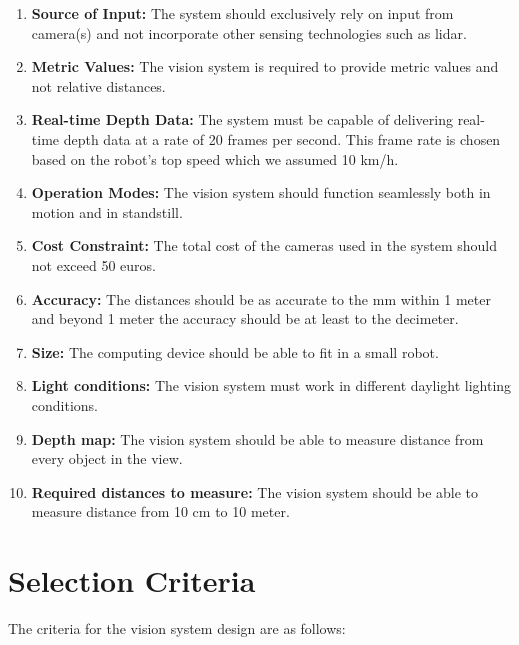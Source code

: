 \documentclass{article}[a4paper]
\begin{document}
\begin{enumerate}
    \item \textbf{Source of Input:} The system should exclusively rely on input from camera(s) and not                      incorporate other sensing technologies such as lidar.
    
    \item \textbf{Metric Values:} The vision system is required to provide metric values and not relative                   distances.
    
    \item \textbf{Real-time Depth Data:} The system must be capable of delivering real-time depth data at a         rate of 20 frames per second. This frame rate is chosen based on the robot's top speed which            we assumed 10 km/h.
    
    \item \textbf{Operation Modes:} The vision system should function seamlessly both in motion and in                  standstill.
    
    \item \textbf{Cost Constraint:} The total cost of the cameras used in the system should not exceed             50 euros.

    \item \textbf{Accuracy:} The distances should be as accurate to the mm within 1 meter and beyond 1 meter the accuracy should be at least to the decimeter. 

    \item \textbf{Size:} The computing device should be able to fit in a small robot.
    \item \textbf{Light conditions:} The vision system must work in different daylight lighting conditions.
    \item \textbf{Depth map:} The vision system should be able to measure distance from every object in the view.
    \item \textbf{Required distances to measure:} The vision system should be able to measure distance from 10 cm to 10 meter.
\end{enumerate}

\newpage
\section{Selection Criteria}
The criteria for the vision system design are as follows:
\end{document}
